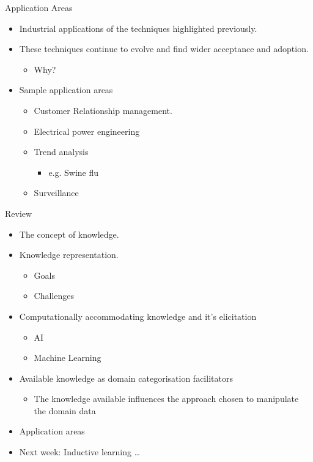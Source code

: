 \documentclass[%
pdf,
colorBG,
slideColor,
tcrico,
]{prosper}
\begin{document}
\begin{slide}{Application Areas}
\footnotesize
\begin{itemize}
 \item Industrial applications of the techniques highlighted previously.
\item These techniques continue to evolve and find wider acceptance and adoption.
	\begin{itemize}
	\item Why?
	\end{itemize}
\item Sample application areas
	\begin{itemize}
	\item Customer Relationship management.
	\item Electrical power engineering
	\item Trend analysis 
		\begin{itemize}
		\item e.g. Swine flu 
		\end{itemize}
\item Surveillance
	\end{itemize}
\end{itemize}
\end{slide}


\begin{slide}{Review}
\tiny
\begin{itemize}
 \item The concept of knowledge.
\item Knowledge representation.
	\begin{itemize}
	\item Goals 
	\item Challenges
	\end{itemize}
\item Computationally accommodating knowledge and it's elicitation 
	\begin{itemize}
	\item AI
	\item Machine  Learning
	\end{itemize}
\item Available knowledge as domain categorisation facilitators 
	\begin{itemize}
	\item The knowledge available influences the approach chosen to manipulate the domain data 
	\end{itemize}
\item Application areas 
\item Next week: Inductive learning \dots

\end{itemize}
\end{slide}
\end{document}
